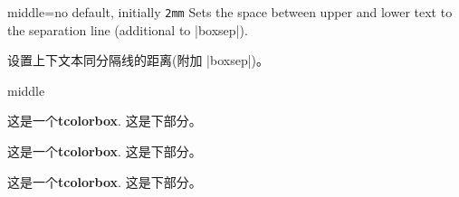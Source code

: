 \begin{docTcbKey}{middle}{=}{no default, initially \texttt{2mm}}
Sets the space between upper and lower text to the separation line
(additional to |boxsep|).


设置上下文本同分隔线的距离(附加 |boxsep|)。
\begin{exdispExample}{middle}

\begin{tcolorbox}[middle=0mm,boxsep=0mm]
这是一个\textbf{tcolorbox}.
\tcblower
这是下部分。
\end{tcolorbox}
\begin{tcolorbox}[boxsep=0mm]
这是一个\textbf{tcolorbox}.
\tcblower
这是下部分。
\end{tcolorbox}
\begin{tcolorbox}
这是一个\textbf{tcolorbox}.
\tcblower
这是下部分。
\end{tcolorbox}
\end{exdispExample}
\end{docTcbKey}



